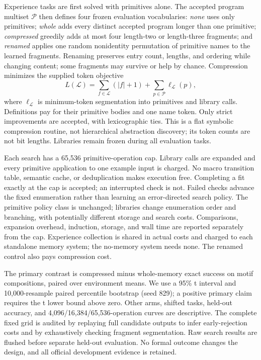 \documentclass[11pt]{article}
\begin{document}
Experience tasks are first solved with primitives alone. The accepted program
multiset $\mathcal P$ then defines four frozen evaluation vocabularies:
\emph{none} uses only primitives; \emph{whole} adds every distinct accepted
program longer than one primitive; \emph{compressed} greedily adds at most
four length-two or length-three fragments; and \emph{renamed} applies one
random nonidentity permutation of primitive names to the learned fragments.
Renaming preserves entry count, lengths, and ordering while changing content;
some fragments may survive or help by chance. Compression minimizes the
supplied token objective
\[
 L(\mathcal L)=\sum_{f\in\mathcal L}(|f|+1)
                  +\sum_{p\in\mathcal P}\ell_{\mathcal L}(p),
\]
where $\ell_{\mathcal L}$ is minimum-token segmentation into primitives and
library calls. Definitions pay for their primitive bodies and one name token.
Only strict improvements are accepted, with lexicographic ties. This is a
flat symbolic compression routine, not hierarchical abstraction discovery;
its token counts are not bit lengths. Libraries remain frozen during all
evaluation tasks.

Each search has a 65,536 primitive-operation cap. Library calls are expanded
and every primitive application to one example input is charged. No macro
transition table, semantic cache, or deduplication makes execution free.
Completing a fit exactly at the cap is accepted; an interrupted check is not.
Failed checks advance the fixed enumeration rather than learning an
error-directed search policy. The primitive policy class is unchanged;
libraries change enumeration order and branching, with potentially different
storage and search costs. Comparisons, expansion overhead, induction, storage,
and wall time are reported separately from the cap. Experience collection is
shared in actual costs and charged to each standalone memory system; the
no-memory system needs none. The renamed control also pays compression cost.

The primary contrast is compressed minus whole-memory exact success on motif
compositions, paired over environment means. We use a 95\% t interval and
10,000-resample paired percentile bootstrap (seed 829); a positive primary
claim requires the t lower bound above zero. Other arms, shifted tasks,
held-out accuracy, and 4,096/16,384/65,536-operation curves are descriptive.
The complete fixed grid is audited by replaying full candidate outputs to
infer early-rejection costs and by exhaustively checking fragment segmentation.
Raw search results are flushed before separate held-out evaluation. No formal
outcome changes the design, and all official development evidence is retained.
\end{document}
